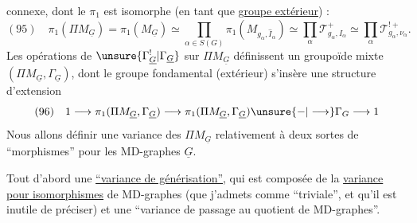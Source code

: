 connexe, dont le $\pi_1$ est isomorphe (en tant que \uline{groupe extérieur}) :
\[
(95)\quad\pi_1(\Pi M_{\underline G})=\pi_1(M_{\underline G})\simeq\prod_{\alpha\in S(G)}\pi_1(M_{g_\alpha,\widehat I_\alpha})\simeq\prod_\alpha\mathcal T^+_{g_\alpha,I_\alpha}\simeq\prod_\alpha\mathcal T^{!+}_{g_\alpha,\nu_\alpha}.
\]
Les opérations de $\unsure{\Gamma^{!}_{\underline G}|\Gamma_{\underline G}}$ sur $\Pi M_{\underline G}$ définissent un groupoïde mixte $(\Pi M_{\underline G},\Gamma_{\underline G})$, dont le groupe fondamental (extérieur) s'insère   une structure d'extension
\[
(96)\quad1\longrightarrow\pi_1(\Pi M_{\underline G},\Gamma_{\underline G})\longrightarrow\pi_1(\Pi M_{\underline G},\Gamma_{\underline G})\unsure{-|\longrightarrow}\Gamma_G\longrightarrow1
\]
Nous allons définir une  variance des $\Pi M_{\underline G}$ relativement à deux sortes de ``morphismes'' pour les MD-graphes $\underline G$. 

Tout d'abord une \uline{``variance de générisation''}, qui est composée de la \uline{variance pour isomorphismes} de MD-graphes (que j'admets comme ``triviale'', et qu'il est inutile de préciser) et une ``variance de passage au quotient de MD-graphes''.
